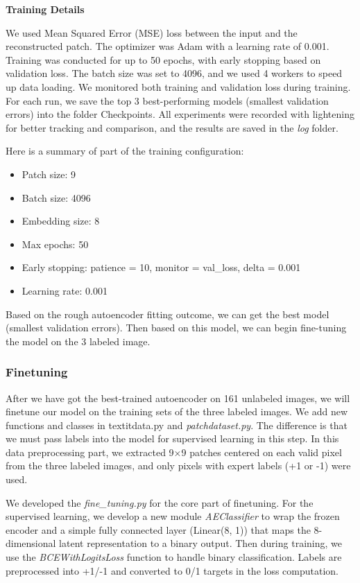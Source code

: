 \documentclass[10pt,letterpaper]{article}
\begin{document}
\textbf{Training Details}

We used Mean Squared Error (MSE) loss between the input and the reconstructed patch. The optimizer was Adam with a learning rate of 0.001. Training was conducted for up to 50 epochs, with early stopping based on validation loss. The batch size was set to 4096, and we used 4 workers to speed up data loading.
We monitored both training and validation loss during training. For each run, we save the top 3 best-performing models (smallest validation errors) into the folder Checkpoints. All experiments were recorded with lightening for better tracking and comparison, and the results are saved in the \textit{log} folder.

Here is a summary of part of the training configuration:

\begin{itemize}
\item Patch size: 9
\item Batch size: 4096
\item Embedding size: 8
\item Max epochs: 50
\item Early stopping: patience = 10, monitor = val\_loss, delta = 0.001
\item Learning rate: 0.001
\end{itemize}


Based on the rough autoencoder fitting outcome, we can get the best model (smallest validation errors). Then based on this model, we can begin fine-tuning the model on the 3 labeled image. 

\subsubsection{Finetuning}

After we have got the best-trained autoencoder on 161 unlabeled images, we will finetune our model on the training sets of the three labeled images.  We add new functions and classes in textit{data.py} and \textit{patchdataset.py}. The difference is that we must pass labels into the model for supervised learning in this step. In this data preprocessing part, we extracted 9×9 patches centered on each valid pixel from the three labeled images, and only pixels with expert labels (+1 or -1) were used.


We developed the \textit{fine\_tuning.py} for the core part of finetuning. For the supervised learning, we develop a new module \textit{AEClassifier} to wrap the frozen encoder and a simple fully connected layer (Linear(8, 1)) that maps the 8-dimensional latent representation to a binary output. Then during training, we use the \textit{BCEWithLogitsLoss} function to handle binary classification. Labels are preprocessed into +1/-1 and converted to 0/1 targets in the loss computation. 
\end{document}
